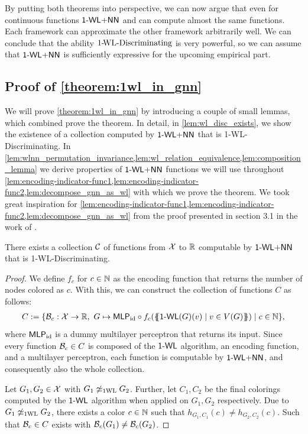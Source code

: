 By putting both theorems into perspective, we can now argue that even for continuous functions $\textsf{1-WL+NN}$ and \gnns can compute almost the same functions. Each framework can approximate the other framework arbitrarily well. We can conclude that the ability $\text{1-\!WL-Discriminating}$ is very powerful, so we can assume that $\textsf{1-WL+NN}$ is sufficiently expressive for the upcoming empirical part.

\subsection{Proof of \autoref{theorem:1wl_in_gnn}}\label{sec:proof_theorem:1wl_in_gnn}
We will prove \autoref{theorem:1wl_in_gnn} by introducing a couple of small lemmas, which combined prove the theorem. In detail, in \autoref{lem:wl_disc_exists}, we show the existence of a collection computed by $\textsf{1-WL+NN}$ that is 1-\!WL-Discriminating. In \cref{lem:wlnn_permutation_invariance,lem:wl_relation_equivalence,lem:composition_lemma} we derive properties of $\textsf{1-WL+NN}$ functions we will use throughout \cref{lem:encoding-indicator-func1,lem:encoding-indicator-func2,lem:decompose_gnn_as_wl} with which we prove the theorem.
We took great inspiration for \cref{lem:encoding-indicator-func1,lem:encoding-indicator-func2,lem:decompose_gnn_as_wl} from the proof presented in section 3.1 in the work of \cite{Chen2019}.

\begin{lemma}\label{lem:wl_disc_exists}
    There exists a collection $\mathcal{C}$ of functions from $\mathcal{X}$ to $\mathbb{R}$ computable by $\textsf{1-WL+NN}$ that is 1-\!WL-Discriminating.
\end{lemma}

\begin{proof}
    We define $f_c$ for $c \in \mathbb{N}$ as the encoding function that returns the number of nodes colored as $c$. With this, we can construct the collection of functions $C$ as follows:
    \begin{align*}
        C := \{ \mathcal{B}_c: \mathcal{X} \rightarrow \mathbb{R}, \ G \mapsto \textsf{MLP}_\text{id} \circ f_c (\{\!\!\{ \textsf{1-WL}(G)(v) \mid v \in V(G) \}\!\!\}) \mid c \in \mathbb{N}\},
    \end{align*}
    where $\textsf{MLP}_\text{id}$ is a dummy multilayer perceptron that returns its input. Since every function $\mathcal{B}_c \in C$ is composed of the $\textsf{1-WL}$ algorithm, an encoding function, and a multilayer perceptron, each function is computable by $\textsf{1-WL+NN}$, and consequently also the whole collection.

    Let $G_1, G_2 \in \mathcal{X}$ with $G_1 \not\simeq_{\text{1WL}} G_2$. Further, let $C_1, C_2$ be the final colorings computed by the $\textsf{1-WL}$ algorithm when applied on $G_1, G_2$ respectively. Due to $G_1 \not\simeq_{\text{1WL}} G_2$, there exists a color $c \in \mathbb{N}$ such that $h_{G_1,C_1}(c) \neq h_{G_2,C_2}(c)$. Such that $\mathcal{B}_c \in C$ exists with $\mathcal{B}_c(G_1) \neq \mathcal{B}_c(G_2)$.
\end{proof}

